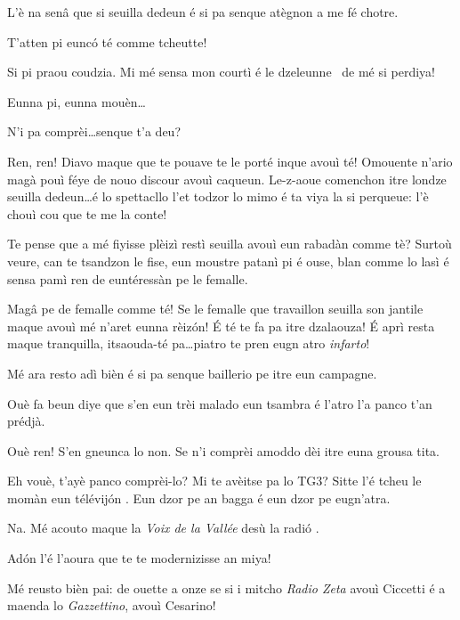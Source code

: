 \begin{drama}

\Gerominespeaks {} L’è na senâ que si seuilla dedeun é si pa senque atègnon a me fé chotre.

\Casimirspeaks T’atten pi eunc\'o té comme tcheutte!

\Gerominespeaks Si pi praou coudzia. Mi mé sensa mon courtì é le dzeleunne \gallina\ de mé si perdiya!

\Casimirspeaks {} Eunna pi, eunna mouèn\ldots

\Gerominespeaks N’i pa comprèi\ldots senque t’a deu?

\Casimirspeaks Ren, ren! Diavo maque que te pouave te le porté inque avouì té! O\-mou\-en\-te n’ario magà pouì féye de nouo discour avouì caqueun. Le-z-aoue comenchon itre londze seuilla dedeun\ldots é lo spettacllo l’et todzor lo mimo  é ta viya la si perqueue: l’è chouì cou que te me la conte!

\Gerominespeaks Te pense que a mé fiyisse plèizì restì seuilla avouì eun rabadàn comme tè? Surtoù veure, can te tsandzon le fise, eun moustre patanì pi é ouse, blan comme lo lasì é sensa pamì ren de euntéressàn pe le femalle.

\Casimirspeaks Mag\^a pe de femalle comme té! Se le femalle que travaillon seuilla son jantile maque avouì mé n’aret eunna rèizón! \'E té te fa pa itre dzalaouza! \'E aprì resta maque tranquilla, itsaouda-té pa\ldots piatro te pren eugn atro \textit{infarto}!

\Gerominespeaks Mé ara resto adì bièn é si pa senque baillerio pe itre eun campagne.

\Casimirspeaks Ouè fa beun diye que s’en eun trèi malado eun tsambra é l’atro  l’a panco t’an prédjà.

\Gerominespeaks Ouè ren! S’en gneunca lo non. Se n'i comprèi a\-mod\-do dèi itre euna grousa tita.

\Casimirspeaks Eh vouè, t’ayè panco comprèi-lo? Mi te avèitse pa lo TG3? Sitte l'é tcheu le momàn eun télévij\'on \tv . Eun dzor pe an bagga é eun dzor pe eugn'atra.

\Gerominespeaks Na. Mé acouto maque la \textit{Voix de la Vallée} desù la radi\'o \radio .

\Casimirspeaks Ad\'on l’é l’aoura que te te modernizisse an miya!

\Gerominespeaks Mé reusto bièn pai: de ouette a onze se si i mitcho \textit{Radio Zeta} avouì Ciccetti é a maenda lo \textit{Gazzettino}, avouì Cesarino!


\end{drama}

